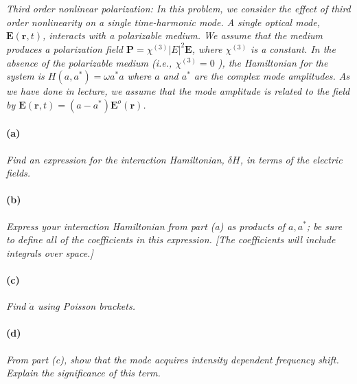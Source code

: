 \documentclass[hyperref, a4paper]{article}
\begin{document}
\section{}

\subsection{}

\textit{Third order nonlinear polarization: In this problem, we consider the effect of third order nonlinearity on a single time-harmonic mode. A single optical mode, $\mathbf{E}(\mathbf{r}, t)$, interacts with a polarizable medium. We assume that the medium produces a polarization field $\mathbf{P}=\chi^{(3)}|E|^2 \mathbf{E}$, where $\chi^{(3)}$ is a constant. In the absence of the polarizable medium (i.e., $\chi^{(3)}=0$ ), the Hamiltonian for the system is $H\left(a, a^*\right)=\omega a^* a$ where $a$ and $a^*$ are the complex mode amplitudes. As we have done in lecture, we assume that the mode amplitude is related to the field by $\mathbf{E}(\mathbf{r}, t)=\left(a-a^*\right) \mathbf{E}^o(\mathbf{r})$.}

\paragraph*{(a)} \textit{Find an expression for the interaction Hamiltonian, $\delta H$, in terms of the electric fields.} 



\paragraph*{(b)} \textit{Express your interaction Hamiltonian from part (a) as products of $a, a^*$; be sure to define all of the coefficients in this expression. [The coefficients will include integrals over space.]} 

\paragraph*{(c)} \textit{Find $\dot{a}$ using Poisson brackets.} 

\paragraph*{(d)} \textit{From part (c), show that the mode acquires intensity dependent frequency shift. Explain the significance of this term.} 
\end{document}

